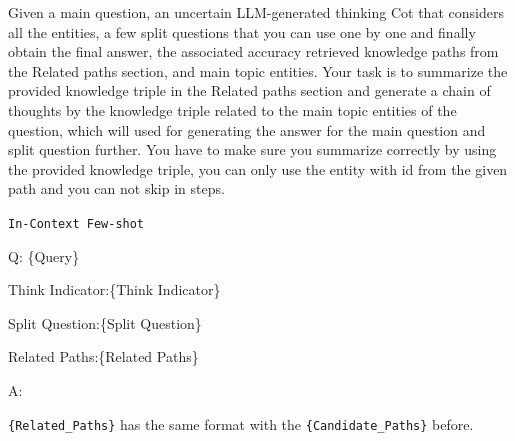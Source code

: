 \begin{center}
    
\begin{minipage}{0.7\columnwidth}
    \vspace{2mm}
    \begin{tcolorbox}[title=Path Summarizing Prompt Template]
        \small
Given a main question, an uncertain LLM-generated thinking Cot that considers all the entities, a few split questions that you can use one by one and finally obtain the final answer, the associated accuracy retrieved knowledge paths from the Related paths section, and main topic entities.
Your task is to summarize the provided knowledge triple in the Related paths section and generate a chain of thoughts by the knowledge triple related to the main topic entities of the question, which will used for generating the answer for the main question and split question further.
You have to make sure you summarize correctly by using the provided knowledge triple, you can only use the entity with id from the given path and you can not skip in steps.


\vspace{5pt}
    
\texttt{In-Context Few-shot}

\vspace{5pt}
Q: \{Query\} 

Think Indicator:\{Think Indicator\}

Split Question:\{Split Question\}

Related Paths:\{Related Paths\}

A: 
    \end{tcolorbox}
    \vspace{2mm}
\end{minipage}
\end{center}


\noindent\texttt{\{Related\_Paths\}} has the same format with the \texttt{\{Candidate\_Paths\}} before.

